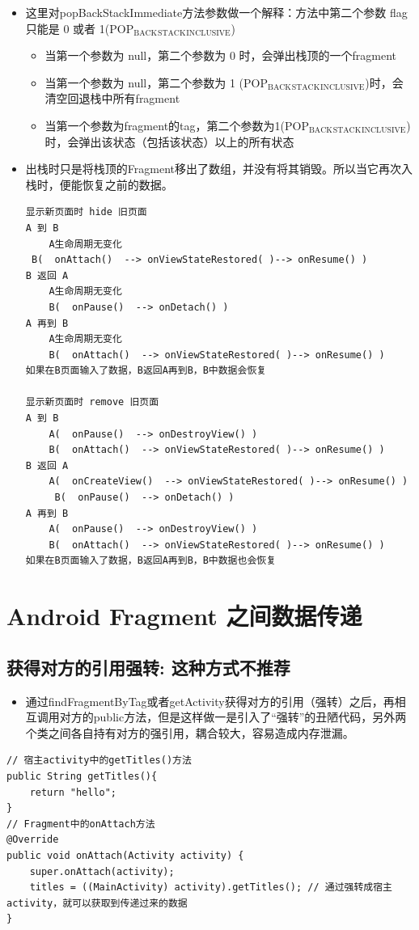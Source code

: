 \documentclass[9pt, b5paaper]{book}
\begin{document}
\begin{itemize}
\item 这里对popBackStackImmediate方法参数做一个解释：方法中第二个参数 flag 只能是 0 或者 1(POP$_{\text{BACK}}$$_{\text{STACK}}$$_{\text{INCLUSIVE}}$)
\begin{itemize}
\item 当第一个参数为 null，第二个参数为 0 时，会弹出栈顶的一个fragment
\item 当第一个参数为 null，第二个参数为 1 (POP$_{\text{BACK}}$$_{\text{STACK}}$$_{\text{INCLUSIVE}}$)时，会清空回退栈中所有fragment
\item 当第一个参数为fragment的tag，第二个参数为1(POP$_{\text{BACK}}$$_{\text{STACK}}$$_{\text{INCLUSIVE}}$)时，会弹出该状态（包括该状态）以上的所有状态
\end{itemize}
\item 出栈时只是将栈顶的Fragment移出了数组，并没有将其销毁。所以当它再次入栈时，便能恢复之前的数据。
\begin{verbatim}
显示新页面时 hide 旧页面
A 到 B
    A生命周期无变化
 B(  onAttach()  --> onViewStateRestored( )--> onResume() )
B 返回 A
    A生命周期无变化
    B(  onPause()  --> onDetach() )
A 再到 B
    A生命周期无变化
    B(  onAttach()  --> onViewStateRestored( )--> onResume() )
如果在B页面输入了数据，B返回A再到B，B中数据会恢复

显示新页面时 remove 旧页面
A 到 B
    A(  onPause()  --> onDestroyView() )
    B(  onAttach()  --> onViewStateRestored( )--> onResume() )
B 返回 A
    A(  onCreateView()  --> onViewStateRestored( )--> onResume() )
     B(  onPause()  --> onDetach() )
A 再到 B
    A(  onPause()  --> onDestroyView() )
    B(  onAttach()  --> onViewStateRestored( )--> onResume() )
如果在B页面输入了数据，B返回A再到B，B中数据也会恢复
\end{verbatim}
\end{itemize}


\chapter{Android Fragment 之间数据传递}
\label{sec-3}
\section{获得对方的引用强转: 这种方式不推荐}
\label{sec-3-1}
\begin{itemize}
\item 通过findFragmentByTag或者getActivity获得对方的引用（强转）之后，再相互调用对方的public方法，但是这样做一是引入了“强转”的丑陋代码，另外两个类之间各自持有对方的强引用，耦合较大，容易造成内存泄漏。
\end{itemize}
\begin{verbatim}
// 宿主activity中的getTitles()方法
public String getTitles(){
    return "hello";
}
// Fragment中的onAttach方法
@Override
public void onAttach(Activity activity) {
    super.onAttach(activity);
    titles = ((MainActivity) activity).getTitles(); // 通过强转成宿主activity，就可以获取到传递过来的数据
}
\end{verbatim}
\end{document}
